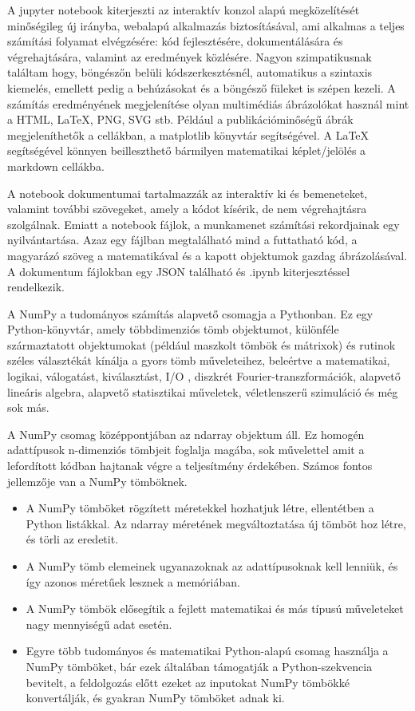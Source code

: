 A jupyter notebook kiterjeszti az interaktív konzol alapú megközelítését minőségileg új irányba, webalapú alkalmazás biztosításával, ami alkalmas a teljes számítási folyamat elvégzésére: kód fejlesztésére, dokumentálására és végrehajtására, valamint az eredmények közlésére.
Nagyon szimpatikusnak találtam hogy, böngészőn belüli kódszerkesztésnél, automatikus a szintaxis kiemelés, emellett pedig a behúzásokat és a böngésző füleket is szépen kezeli.
A számítás eredményének megjelenítése olyan multimédiás ábrázolókat használ mint a HTML, LaTeX, PNG, SVG stb. Például a publikációminőségű ábrák megjeleníthetők a cellákban, a matplotlib könyvtár segítségével. A LaTeX segítségével könnyen beilleszthető bármilyen matematikai képlet/jelölés a markdown cellákba.

 A notebook dokumentumai tartalmazzák az interaktív ki és bemeneteket, valamint további szövegeket, amely a kódot kísérik, de nem végrehajtásra szolgálnak. 
Emiatt a notebook fájlok, a munkamenet számítási rekordjainak egy nyilvántartása. Azaz egy fájlban megtalálható mind a futtatható kód, a magyarázó szöveg a matematikával és a kapott objektumok gazdag ábrázolásával. A dokumentum fájlokban egy JSON található és .ipynb kiterjesztéssel rendelkezik.

A NumPy a tudományos számítás alapvető csomagja a Pythonban.
Ez egy Python-könyvtár, amely többdimenziós tömb objektumot, különféle származtatott objektumokat (például maszkolt tömbök és mátrixok) és rutinok széles választékát kínálja a gyors tömb műveleteihez, beleértve a matematikai, logikai, válogatást, kiválasztást, I/O , diszkrét Fourier-transzformációk, alapvető lineáris algebra, alapvető statisztikai műveletek, véletlenszerű szimuláció és még sok más.

A NumPy csomag középpontjában az ndarray objektum áll. Ez homogén adattípusok n-dimenziós tömbjeit foglalja magába, sok művelettel amit a lefordított kódban hajtanak végre a teljesítmény érdekében.
Számos fontos jellemzője van a NumPy tömböknek.
\begin{itemize}
\item A NumPy tömböket rögzített méretekkel hozhatjuk létre, ellentétben a Python listákkal.
Az ndarray méretének megváltoztatása új tömböt hoz létre, és törli az eredetit.
\item A NumPy tömb elemeinek ugyanazoknak az adattípusoknak kell lenniük, és így azonos méretűek lesznek a memóriában.
\item A NumPy tömbök elősegítik a fejlett matematikai és más típusú műveleteket nagy mennyiségű adat esetén.
\item Egyre több tudományos és matematikai Python-alapú csomag használja a NumPy tömböket, bár ezek általában támogatják a Python-szekvencia bevitelt, a feldolgozás előtt ezeket az inputokat NumPy tömbökké konvertálják, és gyakran NumPy tömböket adnak ki.
\end{itemize}

